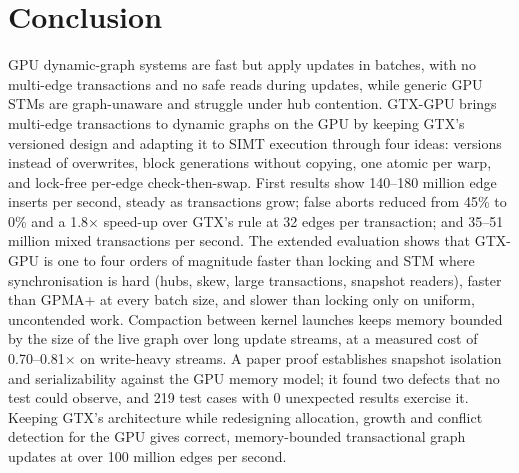 \documentclass[11pt,a4paper,oneside]{report}
\newcommand{\sys}{GTX-GPU}
\begin{document}
\section{Conclusion}
GPU dynamic-graph systems are fast but apply updates in batches, with no multi-edge transactions and no safe reads
during updates, while generic GPU STMs are graph-unaware and struggle under hub contention. \sys{} brings multi-edge
transactions to dynamic graphs on the GPU by keeping GTX's versioned design and adapting it to SIMT execution through
four ideas: versions instead of overwrites, block generations without copying, one atomic per warp, and lock-free
per-edge check-then-swap. First results show 140--180 million edge inserts per second, steady as transactions grow;
false aborts reduced from 45\% to 0\% and a 1.8$\times$ speed-up over GTX's rule at 32 edges per transaction; and 35--51
million mixed transactions per second. The extended evaluation shows that \sys{} is one to four orders of magnitude
faster than locking and STM where synchronisation is hard (hubs, skew, large transactions, snapshot readers), faster
than GPMA+ at every batch size, and slower than locking only on uniform, uncontended work. Compaction between kernel
launches keeps memory bounded by the size of the live graph over long update streams, at a measured cost of
0.70--0.81$\times$ on write-heavy streams. A paper proof establishes snapshot isolation and serializability against
the GPU memory model; it found two defects that no test could observe, and 219 test cases with 0 unexpected results
exercise it. Keeping GTX's architecture while redesigning allocation, growth and conflict detection for the GPU gives
correct, memory-bounded transactional graph updates at over 100 million edges per second.
\end{document}
